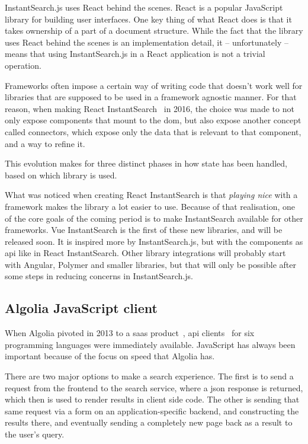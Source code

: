 InstantSearch.js uses React behind the scenes. React\cite{react-doc} is a popular JavaScript \gls{library} for building user interfaces. One key thing of what React does is that it takes ownership of a part of a document structure. While the fact that the \gls{library} uses React behind the scenes is an implementation detail, it -- unfortunately -- means that using InstantSearch.js in a React application is not a trivial operation.

Frameworks often impose a certain way of writing code that doesn't work well for libraries that are supposed to be used in a framework agnostic manner. For that reason, when making React InstantSearch~\cite{react-instantsearch} in 2016, the choice was made to not only expose components that mount to the \acrshort{dom}, but also expose another concept called connectors, which expose only the data that is relevant to that component, and a way to refine it.

This evolution makes for three distinct phases in how state has been handled, based on which \gls{library} is used.

What was noticed when creating React InstantSearch is that \emph{playing nice} with a framework makes the library a lot easier to use. Because of that realisation, one of the core goals of the coming period is to make InstantSearch available for other frameworks. Vue InstantSearch is the first of these new libraries, and will be released soon. It is inspired more by InstantSearch.js, but with the components as \acrshort{api} like in React InstantSearch. Other library integrations will probably start with Angular, Polymer and smaller libraries, but that will only be possible after some steps in reducing concerns in InstantSearch.js.

\subsection{Algolia JavaScript client} %
\label{sub:algolia_js_client}

When Algolia pivoted in 2013 to a \acrshort{saas} product~\cite{algolia-blog-saas}, \acrshort{api} clients~\cite{algolia-blog-lauch} for six programming languages were immediately available. JavaScript has always been important because of the focus on speed that Algolia has.

There are two major options to make a search experience. The first is to send a request from the frontend to the search service, where a \acrshort{json} response is returned, which then is used to render results in client side code. The other is sending that same request via a form on an application-specific backend, and constructing the results there, and eventually sending a completely new page back as a result to the user's query.

